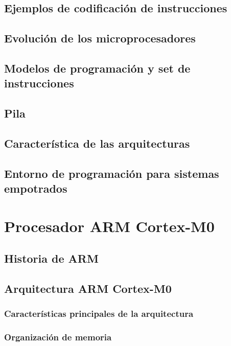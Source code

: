 \documentclass[a4paper]{book}
\begin{document}
\section{Ejemplos de codificación de instrucciones}

\section{Evolución de los microprocesadores}

\section{Modelos de programación y set de instrucciones}

\section{Pila}

\section{Característica de las arquitecturas}

\section{Entorno de programación para sistemas empotrados}

\chapter{Procesador ARM Cortex-M0}

\section{Historia de ARM}

\section{Arquitectura ARM Cortex-M0}

\subsection{Características principales de la arquitectura}

\subsection{Organización de memoria}
\end{document}
